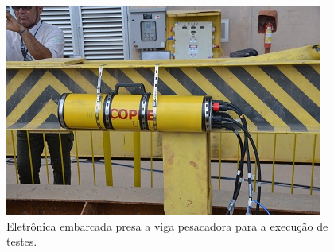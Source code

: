 \begin{figure}[h!]
  \centering
  \includegraphics[width=1\linewidth]{Fotos/JirauJunho2014/10.JPG}
  \caption{Eletrônica embarcada presa a viga pesacadora para a execução de
  testes.}
  \label{nov20134}
\end{figure}